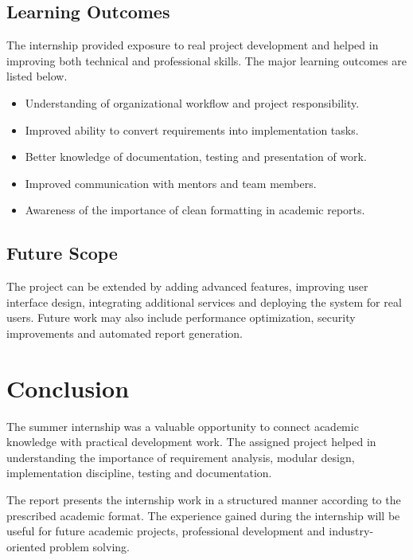\documentclass[12pt,a4paper]{report}
\newcommand{\chapterheader}{CHAPTER HEADING}
\begin{document}
\section{Learning Outcomes}
The internship provided exposure to real project development and helped in improving both technical and professional skills. The major learning outcomes are listed below.

\begin{itemize}[leftmargin=0.35in,itemsep=0pt,parsep=0pt]
\item Understanding of organizational workflow and project responsibility.
\item Improved ability to convert requirements into implementation tasks.
\item Better knowledge of documentation, testing and presentation of work.
\item Improved communication with mentors and team members.
\item Awareness of the importance of clean formatting in academic reports.
\end{itemize}

\section{Future Scope}
The project can be extended by adding advanced features, improving user interface design, integrating additional services and deploying the system for real users. Future work may also include performance optimization, security improvements and automated report generation.
\clearpage

\renewcommand{\chapterheader}{CONCLUSION}
\chapter*{Conclusion}
The summer internship was a valuable opportunity to connect academic knowledge with practical development work. The assigned project helped in understanding the importance of requirement analysis, modular design, implementation discipline, testing and documentation.

The report presents the internship work in a structured manner according to the prescribed academic format. The experience gained during the internship will be useful for future academic projects, professional development and industry-oriented problem solving.
\clearpage

\renewcommand{\chapterheader}{REFERENCES}
\end{document}
